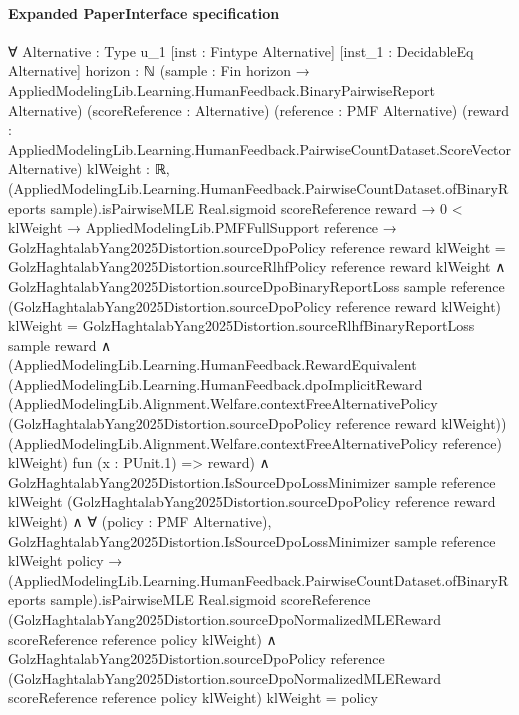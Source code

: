 \documentclass[10pt]{article}
\begin{document}
\paragraph{Expanded PaperInterface specification}
\begin{ReviewVerbatim}
∀ {Alternative : Type u_1} [inst : Fintype Alternative] [inst_1 : DecidableEq Alternative] {horizon : ℕ}
  (sample : Fin horizon → AppliedModelingLib.Learning.HumanFeedback.BinaryPairwiseReport Alternative)
  (scoreReference : Alternative) (reference : PMF Alternative)
  (reward : AppliedModelingLib.Learning.HumanFeedback.PairwiseCountDataset.ScoreVector Alternative) {klWeight : ℝ},
  (AppliedModelingLib.Learning.HumanFeedback.PairwiseCountDataset.ofBinaryReports sample).isPairwiseMLE Real.sigmoid
      scoreReference reward →
    0 < klWeight →
      AppliedModelingLib.PMFFullSupport reference →
        GolzHaghtalabYang2025Distortion.sourceDpoPolicy reference reward klWeight =
            GolzHaghtalabYang2025Distortion.sourceRlhfPolicy reference reward klWeight ∧
          GolzHaghtalabYang2025Distortion.sourceDpoBinaryReportLoss sample reference
                (GolzHaghtalabYang2025Distortion.sourceDpoPolicy reference reward klWeight) klWeight =
              GolzHaghtalabYang2025Distortion.sourceRlhfBinaryReportLoss sample reward ∧
            (AppliedModelingLib.Learning.HumanFeedback.RewardEquivalent
                (AppliedModelingLib.Learning.HumanFeedback.dpoImplicitReward
                  (AppliedModelingLib.Alignment.Welfare.contextFreeAlternativePolicy
                    (GolzHaghtalabYang2025Distortion.sourceDpoPolicy reference reward klWeight))
                  (AppliedModelingLib.Alignment.Welfare.contextFreeAlternativePolicy reference) klWeight)
                fun (x : PUnit.{1}) => reward) ∧
              GolzHaghtalabYang2025Distortion.IsSourceDpoLossMinimizer sample reference klWeight
                  (GolzHaghtalabYang2025Distortion.sourceDpoPolicy reference reward klWeight) ∧
                ∀ (policy : PMF Alternative),
                  GolzHaghtalabYang2025Distortion.IsSourceDpoLossMinimizer sample reference klWeight policy →
                    (AppliedModelingLib.Learning.HumanFeedback.PairwiseCountDataset.ofBinaryReports
                            sample).isPairwiseMLE
                        Real.sigmoid scoreReference
                        (GolzHaghtalabYang2025Distortion.sourceDpoNormalizedMLEReward scoreReference reference policy
                          klWeight) ∧
                      GolzHaghtalabYang2025Distortion.sourceDpoPolicy reference
                          (GolzHaghtalabYang2025Distortion.sourceDpoNormalizedMLEReward scoreReference reference policy
                            klWeight)
                          klWeight =
                        policy
\end{ReviewVerbatim}
\end{document}
